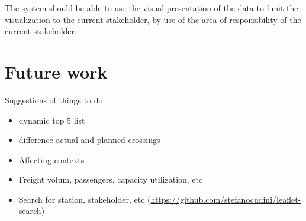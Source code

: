 The system should be able to use the visual presentation of the data to limit
the visualization to the current stakeholder, by use of the area of
responsibility of the current stakeholder.

\section{Future work} %
\label{sec:future_work}

Suggestions of things to do:
\begin{itemize}
	\item dynamic top 5 list
	\item difference actual and planned crossings
	\item Affecting contexts
	\item Freight volum, passengers, capacity utilization, etc
	\item Search for station, stakeholder, etc
	(\url{https://github.com/stefanocudini/leaflet-search})
\end{itemize}

%

